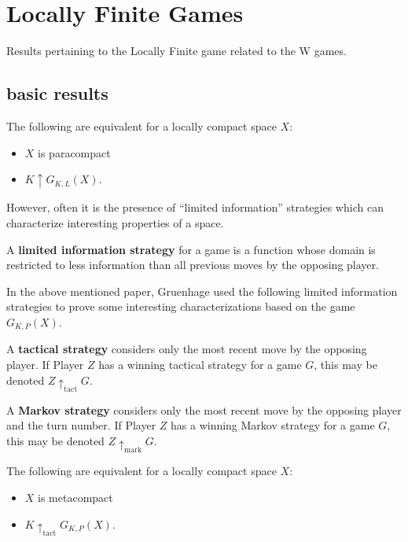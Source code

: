 
\chapter{Locally Finite Games}

Results pertaining to the Locally Finite game related to the W games.


\section{basic results}


\begin{thm}
The following are equivalent for a locally compact space $X$:
    \begin{itemize}
    \item $X$ is paracompact
    \item $K \uparrow G_{K,L}(X)$.
    \end{itemize}
\end{thm}

However, often it is the presence of ``limited information'' strategies which can characterize interesting properties of a space.

\begin{defn}
A \textbf{limited information strategy} for a game is a function whose domain is restricted to less information than all previous moves by the opposing player.
\end{defn}

In the above mentioned paper, Gruenhage used the following limited information strategies to prove some interesting characterizations based on the game $G_{K,P}(X)$.

\begin{defn}
A \textbf{tactical strategy} considers only the most recent move by the opposing player. If Player $Z$ has a winning tactical strategy for a game $G$, this may be denoted $Z \uparrow_{\text{tact}} G$.
\end{defn}

\begin{defn}
A \textbf{Markov strategy} considers only the most recent move by the opposing player and the turn number. If Player $Z$ has a winning Markov strategy for a game $G$, this may be denoted $Z \uparrow_{\text{mark}} G$.
\end{defn}

\begin{thm}
The following are equivalent for a locally compact space $X$:
    \begin{itemize}
    \item $X$ is metacompact
    \item $K \uparrow_{\text{tact}}G_{K,P}(X)$.
    \end{itemize}
\end{thm}

